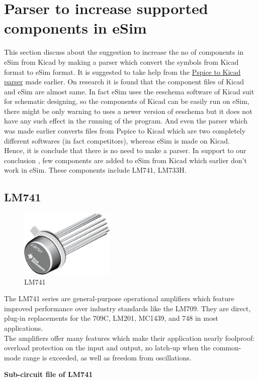 \documentclass[12pt,a4paper]{report}
\begin{document}
\section{Parser to increase supported components in eSim}
This section discuss about the suggestion to increase the no of components in eSim from Kicad by making a parser which convert the symbols from Kicad format to eSim format. It is suggested to take help from the \href{https://github.com/FOSSEE/Pspice-Kicad-Converter}{Pspice to Kicad parser} made earlier. On research it is found that the component files of Kicad and eSim are almost same. In fact eSim uses the eeschema software of Kicad suit for schematic designing, so the components of Kicad can be easily run on eSim, there might be only warning to uses a newer version of eeschema but it does not have any such effect in the running of the program. And even the parser which was made earlier converts files from Pspice to Kicad which are two completely different softwares (in fact competitors), whereas eSim is made on Kicad.
\\ Hence, it is conclude that there is no need to make a parser. In support to our conclusion , few components are added to eSim from Kicad which earlier don't work in eSim. These components include LM741, LM733H.

\subsection{LM741}
\begin{figure} %
	\centering
	\includegraphics[width=0.4\textwidth]{lm741}
	\caption{LM741}
\end{figure}
The LM741 series are general-purpose operational amplifiers which feature improved performance over industry standards like the LM709. They are direct, plug-in replacements for the 709C, LM201, MC1439, and 748 in most applications.
\\
The amplifiers offer many features which make their application nearly foolproof: overload protection on the input and output, no latch-up when the common-mode range is exceeded, as well as freedom from oscillations.
\vspace{5mm}
\\
\begin{flushleft}
\textbf{Sub-circuit file of LM741}
\end{flushleft}
\end{document}
